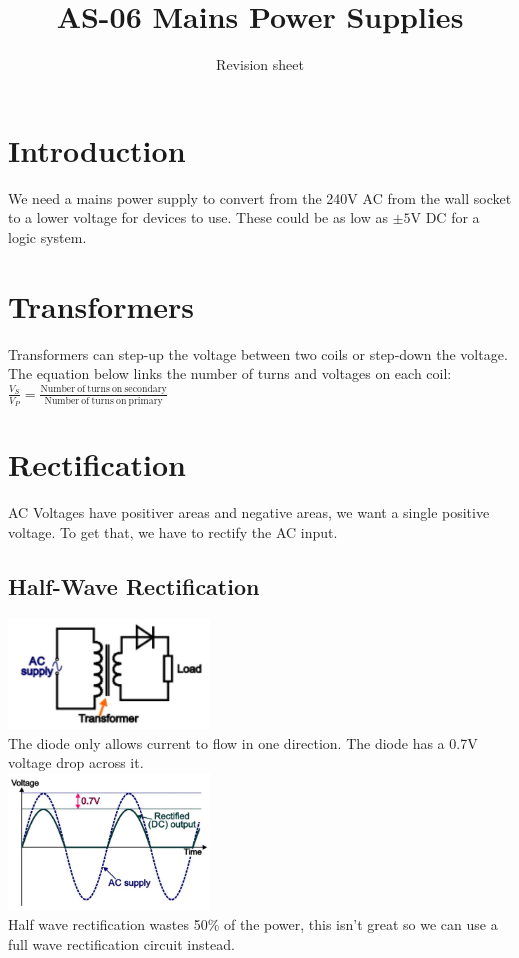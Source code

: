 \documentclass[a4paper, 11pt, twocolumn]{article}
\title{AS-06 Mains Power Supplies}
\author{Revision sheet}
\date{}
\begin{document}
    \maketitle
\section{Introduction}
\thispagestyle{fancy}
We need a mains power supply to convert from the 240V AC from the wall socket to a lower voltage for devices to use. These could be as low as $\pm5$V DC for a logic system. 

\section{Transformers}
Transformers can step-up the voltage between two coils or step-down the voltage. The equation below links the number of turns and voltages on each coil:\newline
$\frac{V_S}{V_P}=\frac{\mathrm{Number\ of\ turns\ on\ secondary}}{\mathrm{Number\ of\ turns\ on\ primary}}$

\section{Rectification}
AC Voltages have positiver areas and negative areas, we want a single positive voltage. To get that, we have to rectify the AC input.
\subsection{Half-Wave Rectification}
\includegraphics[width=0.4\textwidth]{halfWaveRectificationCD.jpg}\\
The diode only allows current to flow in one direction. The diode has a 0.7V voltage drop across it. \\
\includegraphics[width=0.4\textwidth]{halfWaveRectificationGraph1.jpg}\\
Half wave rectification wastes 50\% of the power, this isn't great so we can use a full wave rectification circuit instead.
\end{document}
